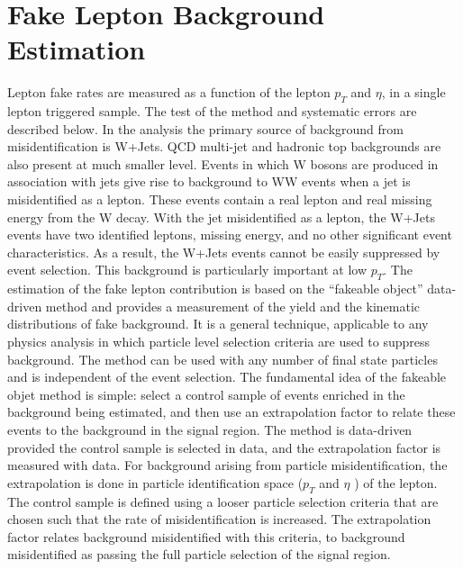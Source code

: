 \section{Fake Lepton Background Estimation}
Lepton fake rates are measured as a
function of the lepton $p_T$ and $\eta$, in a single lepton triggered sample. The test of the method and
systematic errors are described below.
In the analysis
the primary source of background from misidentification is W+Jets. QCD multi-jet and hadronic top backgrounds
are also present at much smaller level. Events in which W bosons are produced in association
with jets give rise to background to WW events when a jet is misidentified as a lepton. These
events contain a real lepton and real missing energy from the W decay. With the jet misidentified 
as a lepton, the W+Jets events have two identified leptons, missing energy, and no other
significant event characteristics. As a result, the W+Jets events cannot be easily suppressed
by event selection. This background is particularly important at low $p_T$.
The estimation of the fake lepton contribution is based on the ``fakeable object'' data-driven
method and provides a measurement of the yield and the kinematic distributions of fake background. 
It is a general technique, applicable to any physics analysis in which particle level
selection criteria are used to suppress background. The method can be used with any number
of final state particles and is independent of the event selection.
The fundamental idea of the fakeable objet method is simple: select a control sample of events
enriched in the background being estimated, and then use an extrapolation factor to relate these
events to the background in the signal region. The method is data-driven provided the control
sample is selected in data, and the extrapolation factor is measured with data. For background
arising from particle misidentification, the extrapolation is done in particle identification space
($p_T$ and $\eta$ ) of the lepton. The control sample is defined using a looser particle selection criteria
that are chosen such that the rate of misidentification is increased. The extrapolation factor
relates background misidentified with this criteria, to background misidentified as passing the
full particle selection of the signal region.
